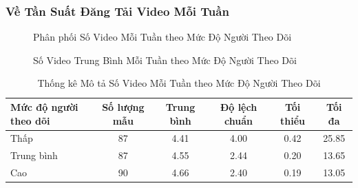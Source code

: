 \subsubsection{Về Tần Suất Đăng Tải Video Mỗi Tuần}

\begin{figure}[H]
    \centering
    \caption{Phân phối Số Video Mỗi Tuần theo Mức Độ Người Theo Dõi}
    \label{fig:so_video_tuan_phan_phoi}
\end{figure}

\begin{figure}[H]
    \centering
    \caption{Số Video Trung Bình Mỗi Tuần theo Mức Độ Người Theo Dõi}
    \label{fig:so_video_tuan_trung_binh}
\end{figure}

\begin{table}[H]
    \centering
    \begin{tabular}{lccccc}
        \toprule
        Mức độ người theo dõi & Số lượng mẫu & Trung bình & Độ lệch chuẩn & Tối thiểu & Tối đa \\
        \midrule
        Thấp & 87 & 4.41 & 4.00 & 0.42 & 25.85 \\
        Trung bình & 87 & 4.55 & 2.44 & 0.20 & 13.65 \\
        Cao & 90 & 4.66 & 2.40 & 0.19 & 13.05 \\
        \bottomrule
    \end{tabular}
    \caption{Thống kê Mô tả Số Video Mỗi Tuần theo Mức Độ Người Theo Dõi}
    \label{tab:so_video_tuan_thong_ke}
\end{table}

